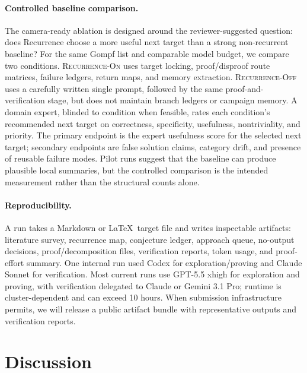\documentclass{article}
\theoremstyle{definition}
\theoremstyle{remark}
\begin{document}
\paragraph{Controlled baseline comparison.}
The camera-ready ablation is designed around the reviewer-suggested question: does Recurrence choose a more useful next target than a strong non-recurrent baseline? For the same Gompf list and comparable model budget, we compare two conditions. \textsc{Recurrence-On} uses target locking, proof/disproof route matrices, failure ledgers, return maps, and memory extraction. \textsc{Recurrence-Off} uses a carefully written single prompt, followed by the same proof-and-verification stage, but does not maintain branch ledgers or campaign memory. A domain expert, blinded to condition when feasible, rates each condition's recommended next target on correctness, specificity, usefulness, nontriviality, and priority. The primary endpoint is the expert usefulness score for the selected next target; secondary endpoints are false solution claims, category drift, and presence of reusable failure modes. Pilot runs suggest that the baseline can produce plausible local summaries, but the controlled comparison is the intended measurement rather than the structural counts alone.

\paragraph{Reproducibility.}
A run takes a Markdown or \LaTeX\ target file and writes inspectable artifacts: literature survey, recurrence map, conjecture ledger, approach queue, no-output decisions, proof/decomposition files, verification reports, token usage, and proof-effort summary. One internal run used Codex for exploration/proving and Claude Sonnet for verification. Most current runs use GPT-5.5 xhigh for exploration and proving, with verification delegated to Claude or Gemini 3.1 Pro; runtime is cluster-dependent and can exceed 10 hours. When submission infrastructure permits, we will release a public artifact bundle with representative outputs and verification reports.

\section{Discussion}
\end{document}

